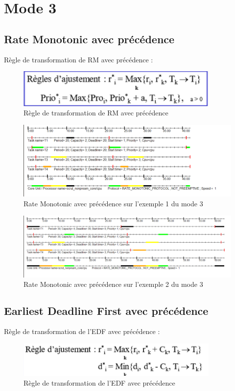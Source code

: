 \section{Mode 3}{
  \subsection{Rate Monotonic avec précédence}{
    Règle de transformation de RM avec précédence :

    \begin{figure}[H]
      \centering
      \includegraphics[width=10cm]{
        img/mode3/rm/regle.png
      }
      \caption{Règle de transformation de RM avec précédence}
    \end{figure}
    \begin{figure}[H]
      \centering
      \includegraphics[width=16cm]{
        img/mode3/rm/rm_s1.png
      }
      \caption{Rate Monotonic avec précédence sur l'exemple 1 du mode 3}
    \end{figure}

    \begin{figure}[H]
      \centering
      \includegraphics[width=16cm]{
        img/mode3/rm/rm_s2.png
      }
      \caption{Rate Monotonic avec précédence sur l'exemple 2 du mode 3}
    \end{figure}

  }

  \subsection{Earliest Deadline First avec précédence}{
    Règle de transformation de l'EDF avec précédence :
    \begin{figure}[H]
      \centering
      \includegraphics[width=10cm]{
        img/mode3/edf/regle.png
      }
      \caption{Règle de transformation de l'EDF avec précédence}
    \end{figure}

}}
